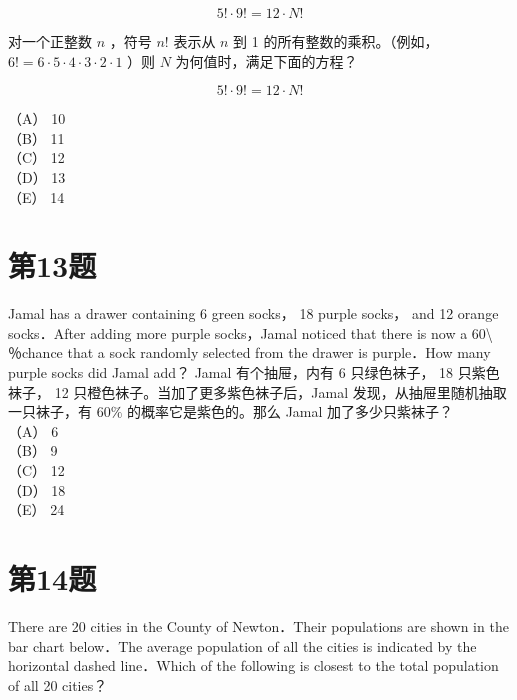 \documentclass[10pt]{article}
\begin{document}
$$
5!\cdot 9!=12 \cdot N!
$$

对一个正整数 $n$ ，符号 $n!$ 表示从 $n$ 到 1 的所有整数的乘积。（例如， $6!=6 \cdot 5 \cdot 4 \cdot 3 \cdot 2 \cdot 1$ ）则 $N$ 为何值时，满足下面的方程？

$$
5!\cdot 9!=12 \cdot N!
$$

（A） 10\\
（B） 11\\
（C） 12\\
（D） 13\\
（E） 14

\section*{第13题}
Jamal has a drawer containing 6 green socks， 18 purple socks， and 12 orange socks．After adding more purple socks，Jamal noticed that there is now a 60\textbackslash ％chance that a sock randomly selected from the drawer is purple．How many purple socks did Jamal add？ Jamal 有个抽屉，内有 6 只绿色袜子， 18 只紫色袜子， 12 只橙色袜子。当加了更多紫色袜子后，Jamal 发现，从抽屉里随机抽取一只袜子，有 $60 \%$ 的概率它是紫色的。那么 Jamal 加了多少只紫袜子？\\
（A） 6\\
（B） 9\\
（C） 12\\
（D） 18\\
（E） 24

\section*{第14题}
There are 20 cities in the County of Newton．Their populations are shown in the bar chart below．The average population of all the cities is indicated by the horizontal dashed line．Which of the following is closest to the total population of all 20 cities？
\end{document}
